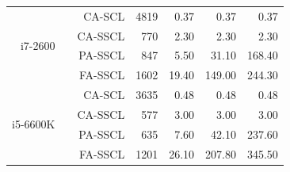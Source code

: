 \begin{table}
\begin{tabular}{r r r r r r r}
    \hline
    \multirow{4}{*}{i7-2600}         & \multirow{4}{*}{\cite{Leonardon2019}} & CA-SCL                            &  4819                             &  0.37           &   0.37          &   0.37          \\
                                     &                                       & CA-SSCL                           &   770                             &  2.30           &   2.30          &   2.30          \\
                                     &                                       & PA-SSCL                           &   847                             &  5.50           &  31.10          & 168.40          \\
                                     &                                       & FA-SSCL                           &  1602                             & 19.40           & 149.00          & 244.30          \\
    \hline
    \multirow{4}{*}{i5-6600K}        & \multirow{4}{*}{\cite{Leonardon2019}} & CA-SCL                            &  3635                             &  0.48           &   0.48          &   0.48          \\
                                     &                                       & CA-SSCL                           &   577                             &  3.00           &   3.00          &   3.00          \\
                                     &                                       & PA-SSCL                           &   635                             &  7.60           &  42.10          & 237.60          \\
                                     &                                       & FA-SSCL                           &  1201                             & 26.10           & 207.80          & 345.50          \\
  \end{tabular}
\end{table}

